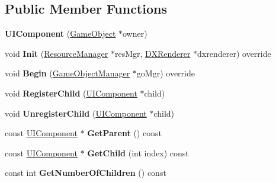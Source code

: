 \subsection*{Public Member Functions}
\begin{DoxyCompactItemize}
\item 
\mbox{\label{classUIComponent_ab7b881b2d2604cbf0a96c4046abc5f04}} 
{\bfseries U\+I\+Component} (\hyperlink{classGameObject}{Game\+Object} $\ast$owner)
\item 
\mbox{\label{classUIComponent_ab4632b919bcdf5954cbee5c32b01a38d}} 
void {\bfseries Init} (\hyperlink{classResourceManager}{Resource\+Manager} $\ast$res\+Mgr, \hyperlink{classDXRenderer}{D\+X\+Renderer} $\ast$dxrenderer) override
\item 
\mbox{\label{classUIComponent_ace6f4cbb1c52f59378b3a33c127dda2c}} 
void {\bfseries Begin} (\hyperlink{classGameObjectManager}{Game\+Object\+Manager} $\ast$go\+Mgr) override
\item 
\mbox{\label{classUIComponent_a18bda3b790b4daeefd3177faa43aec54}} 
void {\bfseries Register\+Child} (\hyperlink{classUIComponent}{U\+I\+Component} $\ast$child)
\item 
\mbox{\label{classUIComponent_adcb498cb2275edd50622bba422b79788}} 
void {\bfseries Unregister\+Child} (\hyperlink{classUIComponent}{U\+I\+Component} $\ast$child)
\item 
\mbox{\label{classUIComponent_ab4148b5b50cdb2e678126f3aca78e06e}} 
const \hyperlink{classUIComponent}{U\+I\+Component} $\ast$ {\bfseries Get\+Parent} () const
\item 
\mbox{\label{classUIComponent_adb25a8abbfbcd980b5415315b7c4da3c}} 
const \hyperlink{classUIComponent}{U\+I\+Component} $\ast$ {\bfseries Get\+Child} (int index) const
\item 
\mbox{\label{classUIComponent_ae6d41c31f9dea151b518164d5f7ffe91}} 
const int {\bfseries Get\+Number\+Of\+Children} () const
\item 
\mbox{\label{classUIComponent_a22f923d6805f5034836ca06ff7579729}} 

\end{DoxyCompactItemize}
